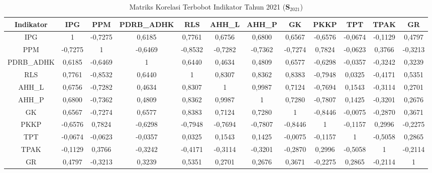 \begin{table}[H]
\centering
\caption{Matriks Korelasi Terbobot Indikator Tahun 2021 ($\mathbf{S}_{2021}$)} \label{tab:app1matriks_intra_loading_2021}
\begin{adjustbox}{max width=\textwidth, max height=0.85\textheight}
\begin{tabular}{|c|c|c|c|c|c|c|c|c|c|c|c|}
\hline
\textbf{Indikator} & \textbf{IPG} & \textbf{PPM} & \textbf{PDRB\_ADHK} & \textbf{RLS} & \textbf{AHH\_L} & \textbf{AHH\_P} & \textbf{GK} & \textbf{PKKP} & \textbf{TPT} & \textbf{TPAK} & \textbf{GR} \\
\hline
IPG & 1 & -0,7275 & 0,6185 & 0,7761 & 0,6756 & 0,6800 & 0,6567 & -0,6576 & -0,0674 & -0,1129 & 0,4797 \\
PPM & -0,7275 & 1 & -0,6469 & -0,8532 & -0,7282 & -0,7362 & -0,7274 & 0,7824 & -0,0623 & 0,3766 & -0,3213 \\
PDRB\_ADHK & 0,6185 & -0,6469 & 1 & 0,6440 & 0,4634 & 0,4809 & 0,6577 & -0,6298 & -0,0357 & -0,3242 & 0,3239 \\
RLS & 0,7761 & -0,8532 & 0,6440 & 1 & 0,8307 & 0,8362 & 0,8383 & -0,7948 & 0,0325 & -0,4171 & 0,5351 \\
AHH\_L & 0,6756 & -0,7282 & 0,4634 & 0,8307 & 1 & 0,9987 & 0,7124 & -0,7694 & 0,1543 & -0,3114 & 0,2701 \\
AHH\_P & 0,6800 & -0,7362 & 0,4809 & 0,8362 & 0,9987 & 1 & 0,7280 & -0,7807 & 0,1425 & -0,3201 & 0,2676 \\
GK & 0,6567 & -0,7274 & 0,6577 & 0,8383 & 0,7124 & 0,7280 & 1 & -0,8446 & -0,0075 & -0,2870 & 0,3671 \\
PKKP & -0,6576 & 0,7824 & -0,6298 & -0,7948 & -0,7694 & -0,7807 & -0,8446 & 1 & -0,1157 & 0,2996 & -0,2275 \\
TPT & -0,0674 & -0,0623 & -0,0357 & 0,0325 & 0,1543 & 0,1425 & -0,0075 & -0,1157 & 1 & -0,5058 & 0,2865 \\
TPAK & -0,1129 & 0,3766 & -0,3242 & -0,4171 & -0,3114 & -0,3201 & -0,2870 & 0,2996 & -0,5058 & 1 & -0,2114 \\
GR & 0,4797 & -0,3213 & 0,3239 & 0,5351 & 0,2701 & 0,2676 & 0,3671 & -0,2275 & 0,2865 & -0,2114 & 1 \\
\hline
\end{tabular}
\end{adjustbox}
\end{table}